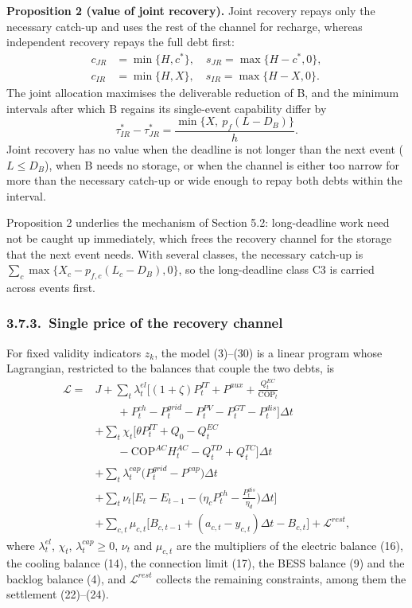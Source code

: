\documentclass[a4paper,twocolumn,fleqn,10pt]{article}
\begin{document}
\textbf{Proposition 2 (value of joint recovery).} Joint recovery repays only the necessary catch-up and uses the rest of the channel for recharge, whereas independent recovery repays the full debt first: \[\begin{aligned}c_{JR}&=\min\{H,c^*\},\quad s_{JR}=\max\{H-c^*,0\},\\c_{IR}&=\min\{H,X\},\quad s_{IR}=\max\{H-X,0\}.\end{aligned} \tag{44}\] The joint allocation maximises the deliverable reduction of B, and the minimum intervals after which B regains its single-event capability differ by \[\tau^*_{IR}-\tau^*_{JR}=\frac{\min\{X,\ p_f(L-D_B)\}}{h}. \tag{45}\] Joint recovery has no value when the deadline is not longer than the next event (\(L\le D_B\)), when B needs no storage, or when the channel is either too narrow for more than the necessary catch-up or wide enough to repay both debts within the interval.

Proposition 2 underlies the mechanism of Section 5.2: long-deadline work need not be caught up immediately, which frees the recovery channel for the storage that the next event needs. With several classes, the necessary catch-up is \(\sum_c\max\{X_c-p_{f,c}(L_c-D_B),0\}\), so the long-deadline class C3 is carried across events first.

\subsubsection*{3.7.3.~Single price of the recovery channel}

For fixed validity indicators \(z_k\), the model (3)--(30) is a linear program whose Lagrangian, restricted to the balances that couple the two debts, is \[\begin{aligned}\mathcal L={}&J+\sum_t\lambda^{el}_t\Big[(1+\zeta)P^{IT}_t+P^{aux}+\frac{Q^{EC}_t}{\mathrm{COP}_t}\\&\qquad+P^{ch}_t-P^{grid}_t-P^{PV}_t-P^{GT}_t-P^{dis}_t\Big]\Delta t\\&+\sum_t\chi_t\big[\theta P^{IT}_t+Q_0-Q^{EC}_t\\&\qquad-\mathrm{COP}^{AC}H^{AC}_t-Q^{TD}_t+Q^{TC}_t\big]\Delta t\\&+\sum_t\lambda^{cap}_t\big(P^{grid}_t-P^{cap}\big)\Delta t\\&+\sum_t\nu_t\Big[E_t-E_{t-1}-\Big(\eta_cP^{ch}_t-\frac{P^{dis}_t}{\eta_d}\Big)\Delta t\Big]\\&+\sum_{c,t}\mu_{c,t}\big[B_{c,t-1}+(a_{c,t}-y_{c,t})\Delta t-B_{c,t}\big]+\mathcal L^{rest},\end{aligned} \tag{46}\] where \(\lambda^{el}_t\), \(\chi_t\), \(\lambda^{cap}_t\ge0\), \(\nu_t\) and \(\mu_{c,t}\) are the multipliers of the electric balance (16), the cooling balance (14), the connection limit (17), the BESS balance (9) and the backlog balance (4), and \(\mathcal L^{rest}\) collects the remaining constraints, among them the settlement (22)--(24).
\end{document}

